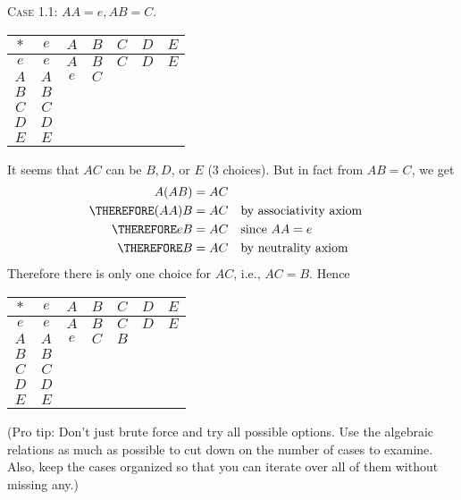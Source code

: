 \textsc{Case 1.1:} $AA = e, AB = C$.
\begin{longtable}{|c||c|c|c|c|c|c|}
\hline
$*$ & $e$ & $A$ & $B$ & $C$ & $D$ & $E$ \\ \hline\hline
$e$ & $e$ & $A$ & $B$ & $C$ & $D$ & $E$ \\ \hline
$A$ & $A$ & $e$ & $C$ &     &     &     \\ \hline
$B$ & $B$ &     &     &     &     &     \\ \hline
$C$ & $C$ &     &     &     &     &     \\ \hline
$D$ & $D$ &     &     &     &     &     \\ \hline
$E$ & $E$ &     &     &     &     &     \\ \hline
\end{longtable}
It seems that $AC$ can be $B,D$, or $E$ (3 choices).
But in fact
from $AB = C$, we get
\begin{align*}
           A(AB) &= AC \\
\THEREFORE (AA)B &= AC & & \text{by associativity axiom} \\
\THEREFORE eB    &= AC & & \text{since $AA = e$}\\
\THEREFORE B     &= AC & & \text{by neutrality axiom}
\end{align*}
Therefore there is only one choice for $AC$, i.e., $AC = B$.
Hence
\begin{longtable}{|c||c|c|c|c|c|c|}
\hline
$*$ & $e$ & $A$ & $B$ & $C$ & $D$ & $E$ \\ \hline\hline
$e$ & $e$ & $A$ & $B$ & $C$ & $D$ & $E$ \\ \hline
$A$ & $A$ & $e$ & $C$ & $B$ &     &     \\ \hline
$B$ & $B$ &     &     &     &     &     \\ \hline
$C$ & $C$ &     &     &     &     &     \\ \hline
$D$ & $D$ &     &     &     &     &     \\ \hline
$E$ & $E$ &     &     &     &     &     \\ \hline
\end{longtable}
(Pro tip: Don't just brute force and try all possible options.
Use the algebraic relations as much as possible to cut down on
the number of cases to examine. Also, keep the cases organized
so that you can iterate over all of them without missing any.)

